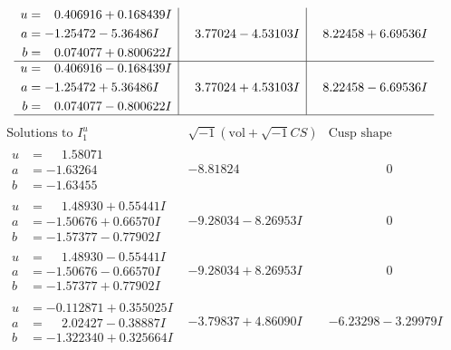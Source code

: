 \documentclass[1p]{elsarticle_modified}
\theoremstyle{definition}
\newcommand{\I}{\sqrt{-1}}
\begin{document}
$$\begin{array}{c|c|c}
\begin{aligned}
u &= \phantom{-}0.406916 + 0.168439 I \\
a &= -1.25472 - 5.36486 I \\
b &= \phantom{-}0.074077 + 0.800622 I\end{aligned}
 & \phantom{-}3.77024 - 4.53103 I & \phantom{-}8.22458 + 6.69536 I \\ \hline\begin{aligned}
u &= \phantom{-}0.406916 - 0.168439 I \\
a &= -1.25472 + 5.36486 I \\
b &= \phantom{-}0.074077 - 0.800622 I\end{aligned}
 & \phantom{-}3.77024 + 4.53103 I & \phantom{-}8.22458 - 6.69536 I\\
 \hline 
 \end{array}$$\newpage$$\begin{array}{c|c|c}  
\text{Solutions to }I^u_{1}& \I (\text{vol} + \sqrt{-1}CS) & \text{Cusp shape}\\
 \hline 
\begin{aligned}
u &= \phantom{-}1.58071\phantom{ +0.000000I} \\
a &= -1.63264\phantom{ +0.000000I} \\
b &= -1.63455\phantom{ +0.000000I}\end{aligned}
 & -8.81824\phantom{ +0.000000I} & \phantom{-0.000000 } 0 \\ \hline\begin{aligned}
u &= \phantom{-}1.48930 + 0.55441 I \\
a &= -1.50676 + 0.66570 I \\
b &= -1.57377 - 0.77902 I\end{aligned}
 & -9.28034 - 8.26953 I & \phantom{-0.000000 } 0 \\ \hline\begin{aligned}
u &= \phantom{-}1.48930 - 0.55441 I \\
a &= -1.50676 - 0.66570 I \\
b &= -1.57377 + 0.77902 I\end{aligned}
 & -9.28034 + 8.26953 I & \phantom{-0.000000 } 0 \\ \hline\begin{aligned}
u &= -0.112871 + 0.355025 I \\
a &= \phantom{-}2.02427 - 0.38887 I \\
b &= -1.322340 + 0.325664 I\end{aligned}
 & -3.79837 + 4.86090 I & -6.23298 - 3.29979 I \\ \hline\begin{aligned}

\end{aligned}
\end{array}$$
\end{document}
